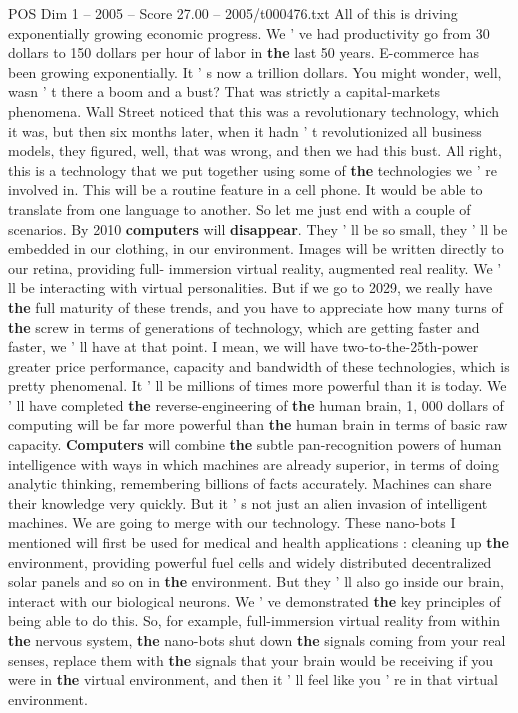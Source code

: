 \begin{textsample}{POS Dim 1 – 2005 – Score 27.00 – 2005/t000476.txt}
All of this is driving exponentially growing economic progress.
We ' ve had productivity go from 30 dollars to 150 dollars per hour of labor in \textbf{the} last 50 years.
E-commerce has been growing exponentially.
It ' s now a trillion dollars.
You might wonder, well, wasn ' t there a boom and a bust?
That was strictly a capital-markets phenomena.
Wall Street noticed that this was a revolutionary technology, which it was, but then six months later, when it hadn ' t revolutionized all business models, they figured, well, that was wrong, and then we had this bust.
All right, this is a technology that we put together using some of \textbf{the} technologies we ' re involved in.
This will be a routine feature in a cell phone.
It would be able to translate from one language to another.
So let me just end with a couple of scenarios.
By 2010 \textbf{computers} will \textbf{disappear}.
They ' ll be so small, they ' ll be embedded in our clothing, in our environment.
Images will be written directly to our retina, providing full- immersion virtual reality, augmented real reality.
We ' ll be interacting with virtual personalities.
But if we go to 2029, we really have \textbf{the} full maturity of these trends, and you have to appreciate how many turns of \textbf{the} screw in terms of generations of technology, which are getting faster and faster, we ' ll have at that point.
I mean, we will have two-to-the-25th-power greater price performance, capacity and bandwidth of these technologies, which is pretty phenomenal.
It ' ll be millions of times more powerful than it is today.
We ' ll have completed \textbf{the} reverse-engineering of \textbf{the} human brain, 1, 000 dollars of computing will be far more powerful than \textbf{the} human brain in terms of basic raw capacity. \textbf{Computers} will combine \textbf{the} subtle pan-recognition powers of human intelligence with ways in which machines are already superior, in terms of doing analytic thinking, remembering billions of facts accurately.
Machines can share their knowledge very quickly.
But it ' s not just an alien invasion of intelligent machines.
We are going to merge with our technology.
These nano-bots I mentioned will first be used for medical and health applications : cleaning up \textbf{the} environment, providing powerful fuel cells and widely distributed decentralized solar panels and so on in \textbf{the} environment.
But they ' ll also go inside our brain, interact with our biological neurons.
We ' ve demonstrated \textbf{the} key principles of being able to do this.
So, for example, full-immersion virtual reality from within \textbf{the} nervous system, \textbf{the} nano-bots shut down \textbf{the} signals coming from your real senses, replace them with \textbf{the} signals that your brain would be receiving if you were in \textbf{the} virtual environment, and then it ' ll feel like you ' re in that virtual environment.

\end{textsample}
